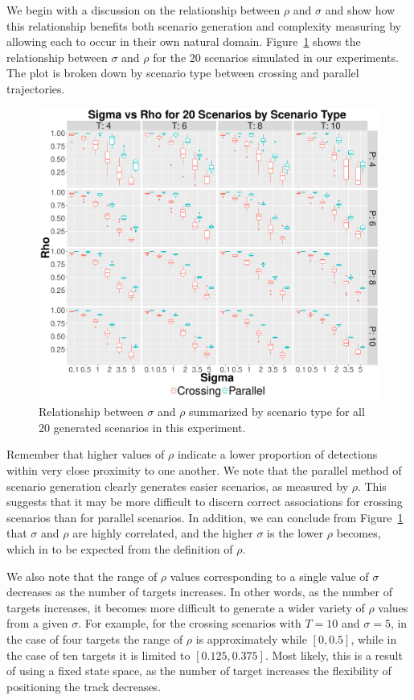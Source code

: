 We begin with a discussion on the relationship between $\rho$ and $\sigma$ and show how this relationship benefits both scenario generation and complexity measuring by allowing each to occur in their own natural domain. Figure~\ref{fig:Sigma_vs_Rho} shows the relationship between $\sigma$ and $\rho$ for the 20 scenarios simulated in our experiments. The plot is broken down by scenario type between crossing and parallel trajectories. 
\begin{figure}[ht]
  \centering
  \includegraphics[width=\columnwidth]{../Figures//Sigma_vs_Rho}
    \caption{Relationship between $\sigma$ and $\rho$ summarized by scenario type for all 20 generated scenarios in this experiment.}
    \label{fig:Sigma_vs_Rho}
\end{figure}

Remember that higher values of $\rho$ indicate a lower proportion of detections within very close proximity to one another. We note that the parallel method of scenario generation clearly generates easier scenarios, as measured by $\rho$. This suggests that it may be more difficult to discern correct associations for crossing scenarios than for parallel scenarios. In addition, we can conclude from Figure~\ref{fig:Sigma_vs_Rho} that $\sigma$ and $\rho$ are highly correlated, and the higher $\sigma$ is the lower $\rho$ becomes, which in to be expected from the definition of $\rho$. 

We also note that the range of $\rho$ values corresponding to a single value of $\sigma$ decreases as the number of targets increases. In other words, as the number of targets increases, it becomes more difficult to generate a wider variety of $\rho$ values from a given $\sigma$. For example, for the crossing scenarios with $T=10$ and $\sigma=5$, in the case of four targets the range of $\rho$ is approximately while $[0,0.5]$, while  in the case of ten targets it is limited to $[0.125,0.375]$. Most likely, this is a result of using a fixed state space, as the number of target increases the flexibility of positioning the track decreases.

